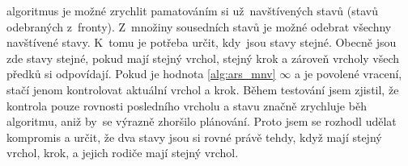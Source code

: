  algoritmus je možné zrychlit pamatováním si už~navštívených stavů (stavů odebraných z~fronty).
Z~množiny sousedních stavů je možné odebrat všechny navštívené stavy.
K~tomu je potřeba určit, kdy~jsou stavy stejné.
Obecně jsou zde stavy stejné, pokud mají stejný vrchol, stejný krok a zároveň vrcholy všech předků si odpovídají.
Pokud je hodnota \ref{alg:ars_mnv} $\infty$ a je povolené vracení, stačí jenom kontrolovat aktuální vrchol a krok.
Během testování jsem zjistil, že kontrola pouze rovnosti posledního vrcholu a stavu značně zrychluje běh algoritmu,
aniž by~se výrazně zhoršilo plánování.
Proto jsem se rozhodl udělat kompromis a určit, že dva stavy jsou si rovné právě tehdy,
když mají stejný vrchol, krok, a jejich rodiče mají stejný vrchol.
